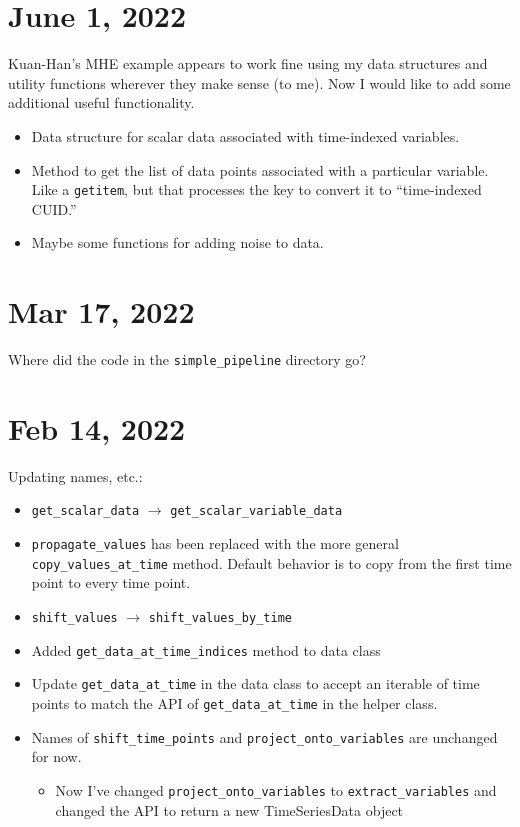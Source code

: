 \documentclass{article}
\begin{document}
\section{June 1, 2022}

Kuan-Han's MHE example appears to work fine using my data structures
and utility functions wherever they make sense (to me).
Now I would like to add some additional useful functionality.
\begin{itemize}
  \item Data structure for scalar data associated with time-indexed variables.
  \item Method to get the list of data points associated with a particular
    variable. Like a \texttt{getitem}, but that processes the key to convert
    it to ``time-indexed CUID.''
  \item Maybe some functions for adding noise to data.
\end{itemize}

\section{Mar 17, 2022}

Where did the code in the \texttt{simple\_pipeline} directory go?

\section{Feb 14, 2022}

Updating names, etc.:
\begin{itemize}
  \item \texttt{get\_scalar\_data} $\rightarrow$
    \texttt{get\_scalar\_variable\_data}
  \item \texttt{propagate\_values} has been replaced with the more
    general \texttt{copy\_values\_at\_time} method.
    Default behavior is to copy from the first time point to every
    time point.
  \item \texttt{shift\_values} $\rightarrow$
    \texttt{shift\_values\_by\_time}
  \item Added \texttt{get\_data\_at\_time\_indices} method to data class
  \item Update \texttt{get\_data\_at\_time} in the data class to accept
    an iterable of time points to match the API of \texttt{get\_data\_at\_time}
    in the helper class.
  \item Names of \texttt{shift\_time\_points} and
    \texttt{project\_onto\_variables} are unchanged for now.
    \begin{itemize}
      \item Now I've changed \texttt{project\_onto\_variables} to
	\texttt{extract\_variables} and changed the API to return a new
	TimeSeriesData object
    \end{itemize}
\end{itemize}
\end{document}
